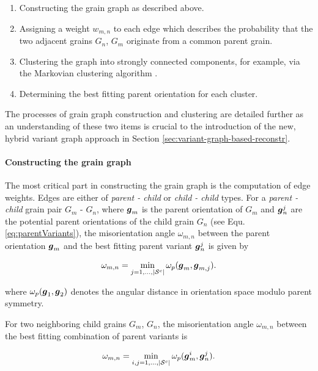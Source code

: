 \documentclass{elsarticle}
\renewcommand{\vec}[1]{\ensuremath \mathbf{\boldsymbol{#1}}}
\numberwithin{equation}{section}
\begin{document}
\begin{enumerate}
\item Constructing the grain graph as described above.
\item Assigning a weight $w_{m,n}$ to each edge which describes the probability that the two adjacent grains $G_n$, $G_m$ originate from a common parent grain.  
\item Clustering the graph into strongly connected components, for example, via the Markovian clustering algorithm \cite{VanDongen2000}.
\item Determining the best fitting parent orientation for each cluster.
\end{enumerate}

The processes of grain graph construction and clustering are detailed further as an understanding of these two items is crucial to the introduction of the new, hybrid variant graph approach in Section \ref{sec:variant-graph-based-reconstr}.



\paragraph{Constructing the grain graph}
The most critical part in constructing the grain graph is the computation of edge weights. Edges are either of \emph{parent - child} or \emph{child - child} types. For a \emph{parent - child} grain pair $G_{m}$ - $G_{n}$, where $\vec g_{m}$ is the parent orientation of $G_m$ and $\vec g_n^j$ are the potential parent orientations of the child grain $G_n$ (see Equ. \eqref{eq:parentVariants}), the misorientation angle $\omega_{m,n}$ between the parent orientation $\vec g_m$ and the best fitting parent variant $\vec g_n^j$ is given by

\begin{equation*}
  \omega_{m,n}
  = \min_{j=1,\ldots,|\mathcal S^c|}
  \omega_p(\vec g_{m},  \vec g_{m,j}).
\end{equation*}

where $\omega_p(\vec g_1,\vec g_2)$ denotes the angular distance in orientation space modulo parent symmetry. 

For two neighboring child grains $G_{m}$, $G_{n}$, the misorientation angle $\omega_{m,n}$ between the best fitting combination of parent variants is

\begin{equation*}
  \omega_{m,n}
  = \min_{i,j = 1,\ldots,|\mathcal S^c|}
  \omega_p(\vec g_m^i,  \vec g_n^j).
\end{equation*}
\end{document}

